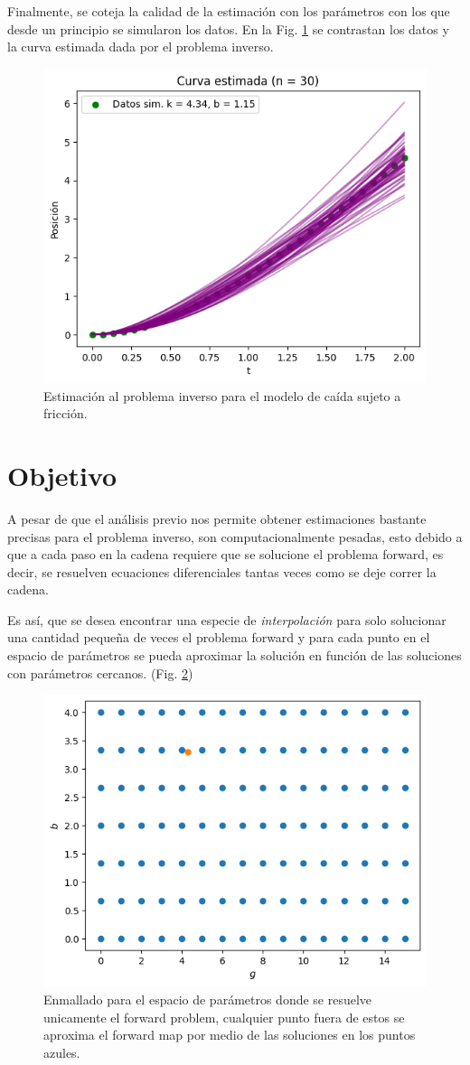 \documentclass{article}
\begin{document}
Finalmente, se coteja la calidad de la estimación con los parámetros con los que desde un principio se simularon los datos. En la Fig. \ref{Fig. 3.05} se contrastan los datos y la curva estimada dada por el problema inverso.

\begin{figure}[H]
    \centering 
    \includegraphics[width = 8 cm]{Figures/curvas.png} 
    \caption{Estimación al problema inverso para el modelo de caída sujeto a fricción.}
    \label{Fig. 3.05}
\end{figure} 


\section{Objetivo}

A pesar de que el análisis previo nos permite obtener estimaciones bastante precisas para el problema inverso, son computacionalmente pesadas, esto debido a que a cada paso en la cadena requiere que se solucione el problema forward, es decir, se resuelven ecuaciones diferenciales tantas veces como se deje correr la cadena. 

Es así, que se desea encontrar una especie de \textit{interpolación} para solo solucionar una cantidad pequeña de veces el problema forward y para cada punto en el espacio de parámetros se pueda aproximar la solución en función de las soluciones con parámetros cercanos. (Fig. \ref{Fig. 3.06})

\begin{figure}[H]
    \centering 
    \includegraphics[width = 8 cm]{Figures/interpolacion.png} 
    \caption{Enmallado para el espacio de parámetros donde se resuelve unicamente el forward problem, cualquier punto fuera de estos se aproxima el forward map por medio de las soluciones en los puntos azules.}
    \label{Fig. 3.06}
\end{figure} 
\end{document}
